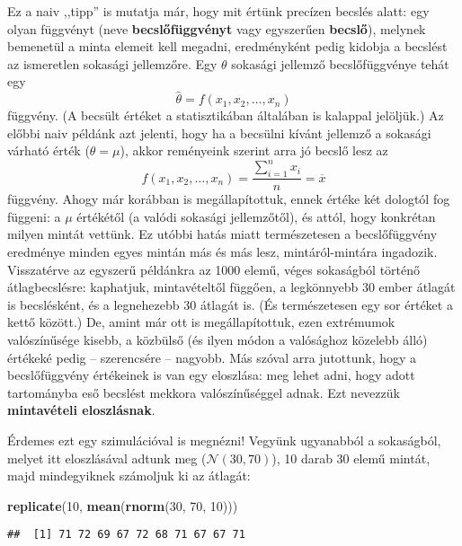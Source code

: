 \documentclass[
]{book}
\newenvironment{Shaded}{\begin{snugshade}}{\end{snugshade}}
\newcommand{\DecValTok}[1]{\textcolor[rgb]{0.00,0.00,0.81}{#1}}
\newcommand{\KeywordTok}[1]{\textcolor[rgb]{0.13,0.29,0.53}{\textbf{#1}}}
\newcommand{\NormalTok}[1]{#1}
\begin{document}
Ez a naiv ,,tipp'' is mutatja már, hogy mit értünk precízen becslés alatt: egy olyan függvényt (neve \textbf{becslőfüggvényt} vagy egyszerűen \textbf{becslő}), melynek bemenetül a minta elemeit kell megadni, eredményként pedig kidobja a becslést az ismeretlen sokasági jellemzőre. Egy \(\theta\) sokasági jellemző becslőfüggvénye tehát egy
\[
    \widehat{\theta} = f\left(x_1,x_2,\ldots,x_n\right)
\]
függvény. (A becsült értéket a statisztikában általában is kalappal jelöljük.) Az előbbi naiv példánk azt jelenti, hogy ha a becsülni kívánt jellemző a sokasági várható érték (\(\theta=\mu\)), akkor reményeink szerint arra jó becslő lesz az
\[
    f\left(x_1,x_2,\ldots,x_n\right)=\frac{\sum_{i=1}^n x_i}{n}=\overline{x}
\]
függvény. Ahogy már korábban is megállapítottuk, ennek értéke két dologtól fog függeni: a \(\mu\) értékétől (a valódi sokasági jellemzőtől), és attól, hogy konkrétan milyen mintát vettünk. Ez utóbbi hatás miatt természetesen a becslőfüggvény eredménye minden egyes mintán más és más lesz, mintáról-mintára ingadozik. Visszatérve az egyszerű példánkra az 1000 elemű, véges sokaságból történő átlagbecslésre: kaphatjuk, mintavételtől függően, a legkönnyebb 30 ember átlagát is becslésként, és a legnehezebb 30 átlagát is. (És természetesen egy sor értéket a kettő között.) De, amint már ott is megállapítottuk, ezen extrémumok valószínűsége kisebb, a közbülső (és ilyen módon a valósághoz közelebb álló) értékeké pedig -- szerencsére -- nagyobb. Más szóval arra jutottunk, hogy a becslőfüggvény értékeinek is van egy eloszlása: meg lehet adni, hogy adott tartományba eső becslést mekkora valószínűséggel adnak. Ezt nevezzük \textbf{mintavételi eloszlásnak}.

Érdemes ezt egy szimulációval is megnézni! Vegyünk ugyanabból a sokaságból, melyet itt eloszlásával adtunk meg (\(\mathcal{N}\left(30,70\right)\)), 10 darab 30 elemű mintát, majd mindegyiknek számoljuk ki az átlagát:

\begin{Shaded}
\begin{Highlighting}[]
\KeywordTok{replicate}\NormalTok{(}\DecValTok{10}\NormalTok{, }\KeywordTok{mean}\NormalTok{(}\KeywordTok{rnorm}\NormalTok{(}\DecValTok{30}\NormalTok{, }\DecValTok{70}\NormalTok{, }\DecValTok{10}\NormalTok{)))}
\end{Highlighting}
\end{Shaded}

\begin{verbatim}
##  [1] 71 72 69 67 72 68 71 67 67 71
\end{verbatim}
\end{document}
